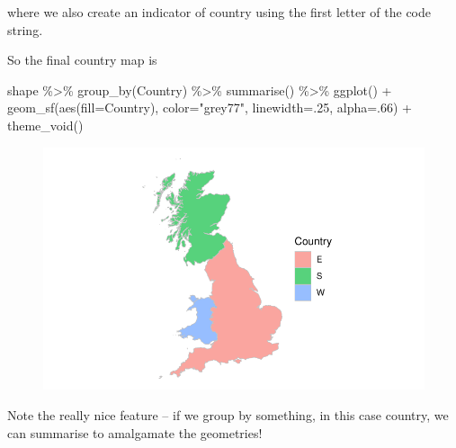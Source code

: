 \documentclass[
  letterpaper,
]{book}
\newenvironment{Shaded}{\begin{snugshade}}{\end{snugshade}}
\newcommand{\AttributeTok}[1]{\textcolor[rgb]{0.40,0.45,0.13}{#1}}
\newcommand{\DecValTok}[1]{\textcolor[rgb]{0.68,0.00,0.00}{#1}}
\newcommand{\FunctionTok}[1]{\textcolor[rgb]{0.28,0.35,0.67}{#1}}
\newcommand{\NormalTok}[1]{\textcolor[rgb]{0.00,0.23,0.31}{#1}}
\newcommand{\SpecialCharTok}[1]{\textcolor[rgb]{0.37,0.37,0.37}{#1}}
\newcommand{\StringTok}[1]{\textcolor[rgb]{0.13,0.47,0.30}{#1}}
\begin{document}
where we also create an indicator of country using the first letter of
the code string.

So the final country map is

\begin{Shaded}
\begin{Highlighting}[]
\NormalTok{shape }\SpecialCharTok{\%\textgreater{}\%}
  \FunctionTok{group\_by}\NormalTok{(Country) }\SpecialCharTok{\%\textgreater{}\%}
  \FunctionTok{summarise}\NormalTok{() }\SpecialCharTok{\%\textgreater{}\%}
  \FunctionTok{ggplot}\NormalTok{() }\SpecialCharTok{+}
  \FunctionTok{geom\_sf}\NormalTok{(}\FunctionTok{aes}\NormalTok{(}\AttributeTok{fill=}\NormalTok{Country), }\AttributeTok{color=}\StringTok{"grey77"}\NormalTok{, }\AttributeTok{linewidth=}\NormalTok{.}\DecValTok{25}\NormalTok{, }\AttributeTok{alpha=}\NormalTok{.}\DecValTok{66}\NormalTok{) }\SpecialCharTok{+}
  \FunctionTok{theme\_void}\NormalTok{()}
\end{Highlighting}
\end{Shaded}

\begin{figure}[H]

{\centering \includegraphics{Maps_files/figure-pdf/map0d-1.pdf}

}

\end{figure}

\begin{tcolorbox}[enhanced jigsaw, colbacktitle=quarto-callout-tip-color!10!white, coltitle=black, toptitle=1mm, breakable, colframe=quarto-callout-tip-color-frame, colback=white, arc=.35mm, bottomtitle=1mm, opacityback=0, leftrule=.75mm, toprule=.15mm, title=\textcolor{quarto-callout-tip-color}{\faLightbulb}\hspace{0.5em}{\texttt{group} and \texttt{summarise} can join geographical areas}, opacitybacktitle=0.6, titlerule=0mm, rightrule=.15mm, bottomrule=.15mm, left=2mm]

Note the really nice feature -- if we group by something, in this case
country, we can summarise to amalgamate the geometries!

\end{tcolorbox}
\end{document}
